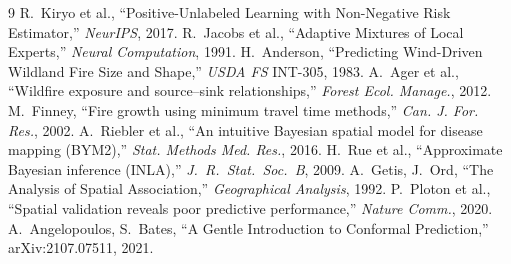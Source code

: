 \documentclass[11pt,a4paper]{article}
\begin{document}
\begin{thebibliography}{9}\small
{} R.~Kiryo et al., ``Positive-Unlabeled Learning with Non-Negative Risk Estimator,'' \emph{NeurIPS}, 2017.
 R.~Jacobs et al., ``Adaptive Mixtures of Local Experts,'' \emph{Neural Computation}, 1991.
 H.~Anderson, ``Predicting Wind-Driven Wildland Fire Size and Shape,'' \emph{USDA FS} INT-305, 1983.
 A.~Ager et al., ``Wildfire exposure and source--sink relationships,'' \emph{Forest Ecol. Manage.}, 2012.
 M.~Finney, ``Fire growth using minimum travel time methods,'' \emph{Can. J. For. Res.}, 2002.
 A.~Riebler et al., ``An intuitive Bayesian spatial model for disease mapping (BYM2),'' \emph{Stat. Methods Med. Res.}, 2016.
 H.~Rue et al., ``Approximate Bayesian inference (INLA),'' \emph{J.\ R.\ Stat.\ Soc.\ B}, 2009.
 A.~Getis, J.~Ord, ``The Analysis of Spatial Association,'' \emph{Geographical Analysis}, 1992.
 P.~Ploton et al., ``Spatial validation reveals poor predictive performance,'' \emph{Nature Comm.}, 2020.
 A.~Angelopoulos, S.~Bates, ``A Gentle Introduction to Conformal Prediction,'' arXiv:2107.07511, 2021.
\end{thebibliography}
\end{document}
